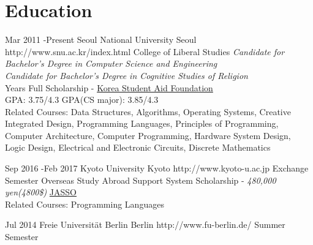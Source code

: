 \documentclass[10pt]{article} %
\begin{document}
\section{Education}

\job
{Mar 2011 -}{Present}
{Seoul National University}
{Seoul}
{http://www.snu.ac.kr/index.html}
{College of Liberal Studies}
{
\textit{Candidate for Bachelor's Degree in Computer Science and Engineering}\\
\if{}
\textit{Candidate for Bachelor's Degree in Cognitive Studies of Religion}\\
 Years Full Scholarship - \href{http://eng.kosaf.go.kr/jsp/main.jsp}{Korea Student Aid Foundation}\\
GPA: 3.75/4.3 \hspace{10mm} GPA(CS major): 3.85/4.3\\
Related Courses: Data Structures, Algorithms, Operating Systems, Creative Integrated Design, Programming Languages, Principles of Programming, Computer Architecture, Computer Programming, Hardware System Design, Logic Design, Electrical and Electronic Circuits, Discrete Mathematics
}


\if{}
\job
{Sep 2016 -}{Feb 2017}
{Kyoto University}
{Kyoto}
{http://www.kyoto-u.ac.jp}
{Exchange Semester}
{
Overseas Study Abroad Support System Scholarship - \textit{480,000 yen(4800\$)} \href{http://www.jasso.go.jp/ryugaku/tantosha/study_a/short_term_h/index.html}{JASSO}\\
Related Courses: Programming Languages
}
\fi



\if{}
\jobnocontent
{Jul 2014}{}
{Freie Universität Berlin}
{Berlin}
{http://www.fu-berlin.de/}
{Summer Semester}
\end{document}
